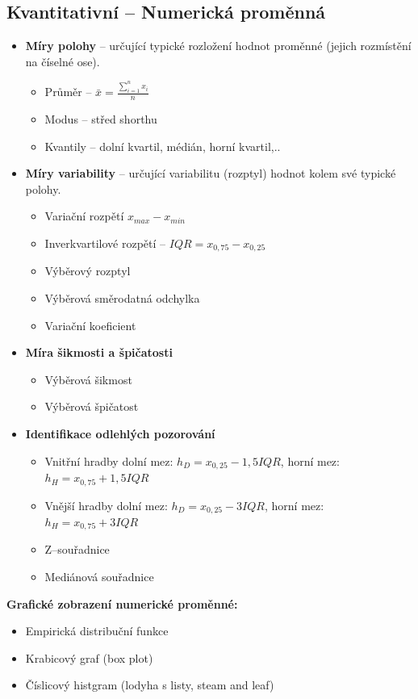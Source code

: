  \subsection{Kvantitativní -- Numerická proměnná}
\begin{itemize}
	\item \textbf{Míry polohy} --  určující typické rozložení hodnot proměnné (jejich rozmístění na číselné ose).

 		\begin{itemize}
 			\item Průměr -- $\bar{x} = \frac{\sum\limits_{i=1}^n x_i}{n}$
 			\item Modus -- střed shorthu
 			\item Kvantily -- dolní kvartil, médián, horní kvartil,..
 		\end{itemize}
 	\item \textbf{Míry variability} -- určující variabilitu (rozptyl) hodnot kolem své typické polohy.
 		\begin{itemize}
 			\item Variační rozpětí $x_{max} - x_{min}$
 			\item Inverkvartilové rozpětí -- $IQR = x_{0,75} - x_{0,25}$
 			\item Výběrový rozptyl
 			\item Výběrová směrodatná odchylka
 			\item Variační koeficient
 		\end{itemize}
 	\item \textbf{Míra šikmosti a špičatosti}	
 		\begin{itemize}
 			\item Výběrová šikmost
 			\item Výběrová špičatost
 		\end{itemize}
 	\item \textbf{Identifikace odlehlých pozorování}	
 		\begin{itemize}
 			\item Vnitřní hradby dolní mez: $h_D = x_{0,25} - 1,5IQR$, horní mez: $h_H = x_{0,75} + 1,5IQR$
 			\item Vnější hradby dolní mez: $h_D = x_{0,25} - 3IQR$, horní mez: $h_H = x_{0,75} + 3IQR$
 			\item Z--souřadnice
 			\item Mediánová souřadnice
 		\end{itemize}
\end{itemize}

\textbf{Grafické zobrazení numerické proměnné:}
\begin{itemize}
	\item Empirická distribuční funkce
	\item Krabicový graf (box plot)
	\item Číslicový histgram (lodyha s listy, steam and leaf)
\end{itemize}

